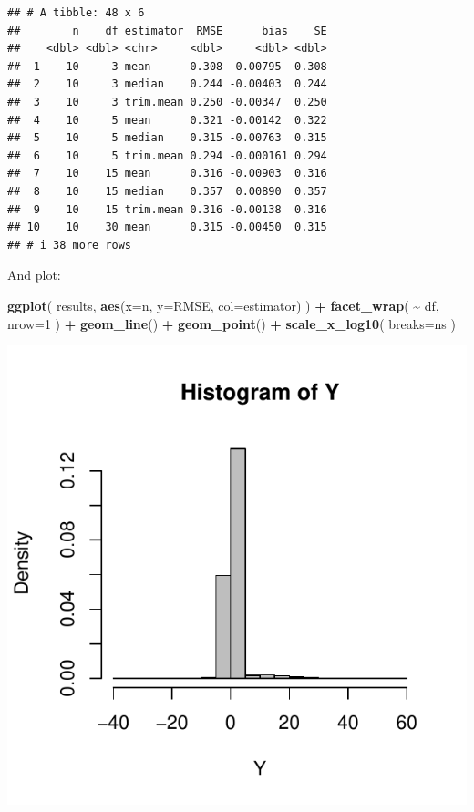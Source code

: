 \documentclass[
]{book}
\newenvironment{Shaded}{\begin{snugshade}}{\end{snugshade}}
\newcommand{\AttributeTok}[1]{\textcolor[rgb]{0.13,0.29,0.53}{#1}}
\newcommand{\DecValTok}[1]{\textcolor[rgb]{0.00,0.00,0.81}{#1}}
\newcommand{\FunctionTok}[1]{\textcolor[rgb]{0.13,0.29,0.53}{\textbf{#1}}}
\newcommand{\NormalTok}[1]{#1}
\newcommand{\SpecialCharTok}[1]{\textcolor[rgb]{0.81,0.36,0.00}{\textbf{#1}}}
\begin{document}
\begin{verbatim}
## # A tibble: 48 x 6
##        n    df estimator  RMSE      bias    SE
##    <dbl> <dbl> <chr>     <dbl>     <dbl> <dbl>
##  1    10     3 mean      0.308 -0.00795  0.308
##  2    10     3 median    0.244 -0.00403  0.244
##  3    10     3 trim.mean 0.250 -0.00347  0.250
##  4    10     5 mean      0.321 -0.00142  0.322
##  5    10     5 median    0.315 -0.00763  0.315
##  6    10     5 trim.mean 0.294 -0.000161 0.294
##  7    10    15 mean      0.316 -0.00903  0.316
##  8    10    15 median    0.357  0.00890  0.357
##  9    10    15 trim.mean 0.316 -0.00138  0.316
## 10    10    30 mean      0.315 -0.00450  0.315
## # i 38 more rows
\end{verbatim}

And plot:

\begin{Shaded}
\begin{Highlighting}[]
\FunctionTok{ggplot}\NormalTok{( results, }\FunctionTok{aes}\NormalTok{(}\AttributeTok{x=}\NormalTok{n, }\AttributeTok{y=}\NormalTok{RMSE, }\AttributeTok{col=}\NormalTok{estimator) ) }\SpecialCharTok{+}
            \FunctionTok{facet\_wrap}\NormalTok{( }\SpecialCharTok{\textasciitilde{}}\NormalTok{ df, }\AttributeTok{nrow=}\DecValTok{1}\NormalTok{ ) }\SpecialCharTok{+}
            \FunctionTok{geom\_line}\NormalTok{() }\SpecialCharTok{+} \FunctionTok{geom\_point}\NormalTok{() }\SpecialCharTok{+}
            \FunctionTok{scale\_x\_log10}\NormalTok{( }\AttributeTok{breaks=}\NormalTok{ns )}
\end{Highlighting}
\end{Shaded}

\begin{center}\includegraphics[width=0.75\linewidth]{Designing-Simulations-in-R_files/figure-latex/unnamed-chunk-188-1} \end{center}
\end{document}
